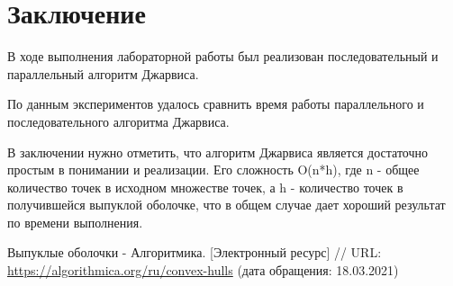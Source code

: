 \documentclass{report}
\begin{document}
\section*{Заключение}
В ходе выполнения лабораторной работы был реализован последовательный и параллельный алгоритм Джарвиса.
\par По данным экспериментов удалось сравнить время работы параллельного и последовательного алгоритма Джарвиса.

\par В заключении нужно отметить, что алгоритм Джарвиса является достаточно простым в понимании и реализации. Его сложность O(n*h), где n - общее количество точек в исходном множестве точек, а h - количество точек в получившейся выпуклой оболочке, что в общем случае дает хороший результат по времени выполнения.
\newpage

\begin{thebibliography}{1}
 Выпуклые оболочки - Алгоритмика. [Электронный ресурс] // URL: \url {https://algorithmica.org/ru/convex-hulls} (дата обращения: 18.03.2021)
\end{thebibliography}
\newpage

\end{document}
